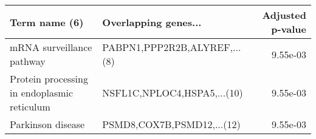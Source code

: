 \begin{tabular}{llr}
\toprule
                              Term name (6) &         Overlapping genes... &  Adjusted p-value \\
\midrule
                  mRNA surveillance pathway & PABPN1,PPP2R2B,ALYREF,...(8) &          9.55e-03 \\
Protein processing in endoplasmic reticulum &  NSFL1C,NPLOC4,HSPA5,...(10) &          9.55e-03 \\
                          Parkinson disease &   PSMD8,COX7B,PSMD12,...(12) &          9.55e-03 \\
\bottomrule
\end{tabular}
